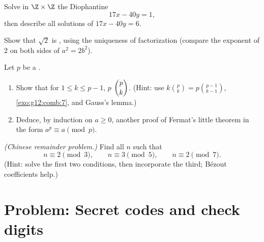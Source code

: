 \begin{exercise}[$\star\star$]\label{exo:g12:arith:7}
Solve in $\Z \times \Z$ the Diophantine 
\[
17x - 40y = 1,
\]
then describe all solutions of $17x - 40y = 6$.
\end{exercise}

\begin{exercise}[$\star\star$]\label{exo:g12:arith:8}
Show that $\sqrt2$ is , using the uniqueness of 
factorization (compare the exponent of $2$ on both sides of $a^2 = 2b^2$).
\end{exercise}

\begin{exercise}[$\star\star\star$]\label{exo:g12:arith:9}
Let $p$ be a .
\begin{enumerate}
  \item Show that for $1 \leq k \leq p - 1$, $p$  $\dbinom{p}{k}$.
        (Hint: use $k\binom pk = p\binom{p-1}{k-1}$, \cref{exo:g12:comb:7},
        and Gauss's lemma.)
  \item Deduce, by induction on $a \geq 0$, another proof of Fermat's little
        theorem in the form $a^p \equiv a \pmod p$.
\end{enumerate}
\end{exercise}

\begin{exercise}[$\star\star\star$]\label{exo:g12:arith:10}
\emph{(Chinese remainder problem.)} Find all  $n$ such that
\[
n \equiv 2 \pmod 3, \qquad n \equiv 3 \pmod 5, \qquad n \equiv 2 \pmod 7 .
\]
(Hint: solve the first two conditions, then incorporate the third; Bézout
coefficients help.)
\end{exercise}

\section{Problem: Secret codes and check digits}

